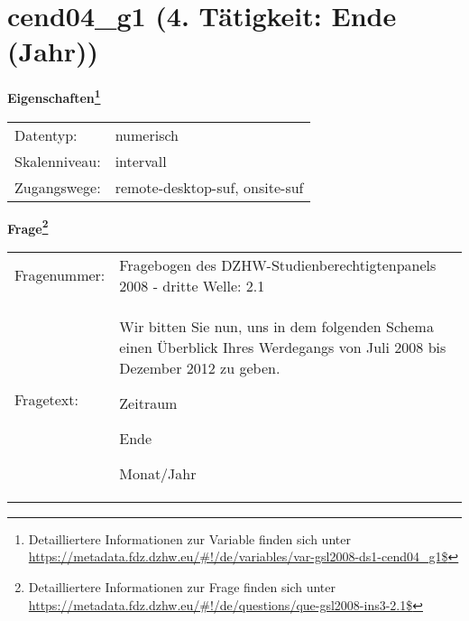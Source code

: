 
    \setcounter{footnote}{0}

    \vspace*{-1.8cm}
	\section{cend04\_g1 (4. Tätigkeit: Ende (Jahr))}
	\label{section:cend04_g1}



    \vspace*{0.5cm}
    \noindent\textbf{Eigenschaften\footnote{Detailliertere Informationen zur Variable finden sich unter
		\url{https://metadata.fdz.dzhw.eu/\#!/de/variables/var-gsl2008-ds1-cend04_g1$}}}\\
	\begin{tabularx}{\hsize}{@{}lX}
	Datentyp: & numerisch \\
	Skalenniveau: & intervall \\
	Zugangswege: &
	  remote-desktop-suf, 
	  onsite-suf
 \\
    \end{tabularx}



				\vspace*{0.5cm}
                \noindent\textbf{Frage\footnote{Detailliertere Informationen zur Frage finden sich unter
		              \url{https://metadata.fdz.dzhw.eu/\#!/de/questions/que-gsl2008-ins3-2.1$}}}\\
				\begin{tabularx}{\hsize}{@{}lX}
					Fragenummer: &
					  Fragebogen des DZHW-Studienberechtigtenpanels 2008 - dritte Welle:
					  2.1
 \\
					Fragetext: & Wir bitten Sie nun, uns in dem folgenden Schema einen Überblick Ihres Werdegangs von Juli 2008 bis Dezember 2012 zu geben.\par  Zeitraum\par  Ende\par  Monat/Jahr \\
				\end{tabularx}





